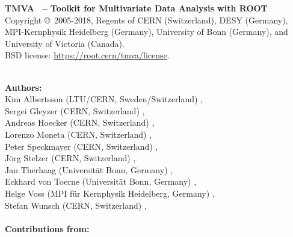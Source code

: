 \begin{center}
{\small\sf
{\sf\bfseries TMVA \TMVAVersion\ -- Toolkit for Multivariate Data Analysis with ROOT}  \\
Copyright 
\copyright\  2005-2018, Regents of 
CERN (Switzerland),  
DESY (Germany),
MPI-Kernphysik Heidelberg (Germany),
University of Bonn (Germany),
and University of Victoria (Canada). \\
BSD license: \url{https://root.cern/tmva/license}.

\hspace{0.5cm} \\
{\sf\bfseries Authors:} \\

Kim Albertsson (LTU/CERN, Sweden/Switzerland) ,\\
Sergei Gleyzer (CERN, Switzerland) , \\
Andreas Hoecker (CERN, Switzerland) , \\
Lorenzo Moneta (CERN, Switzerland) , \\
Peter Speckmayer (CERN, Switzerland) , \\
J\"org Stelzer (CERN, Switzerland) ,\\
Jan Therhaag (Universit\"at Bonn, Germany) , \\
Eckhard von Toerne (Universit\"at Bonn, Germany) ,\\
Helge Voss (MPI f\"ur Kernphysik Heidelberg, Germany) ,\\
Stefan Wunsch (CERN, Switzerland) , \\

\hspace{0.5cm} \\
{\sf\bfseries Contributions from:} \\

}
\end{center}

